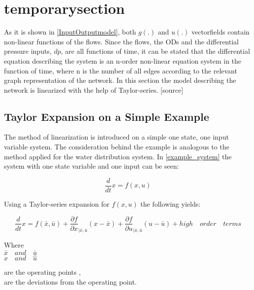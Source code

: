 \section{temporarysection} 
\label{temporarysection}

As it is shown in \eqref{InputOutputmodel}, both $g(.)$ and $u(.)$ vectorfields contain non-linear functions of the flows. Since the flows, the ODs and the differential pressure inputs, $dp$, are all functions of time, it can be stated that the differential equation describing the system is an n-order non-linear equation system in the function of time, where n is the number of all edges according to the relevant graph representation of the network. In this section the model describing the network is linearized with the help of Taylor-series. [source] 

\subsection{Taylor Expansion on a Simple Example}
 \label{Taylorexamplesection}

The method of linearization is introduced on a simple one state, one input variable system. The consideration behind the example is analogous to the method applied for the water distribution system. In \eqref{example_system} the system with one state variable and one input can be seen: 

\begin{equation}
\frac{d}{dt} x = f(x,u)
 \label{example_system}
\end{equation}

Using a Taylor-series expansion for $f(x,u)$ the following yields: 

\begin{equation}
\frac{d}{dt} x = f(\bar{x},\bar{u}) + \frac{\partial f}{\partial x}_{|\bar{x}, \bar{u}} (x-\bar{x}) + \frac{\partial f}{\partial u}_{|\bar{x}, \bar{u}} (u-\bar{u}) + high \quad order \quad terms  
 \label{TaylorExpansion}
\end{equation}

\begin{minipage}[t]{0.20\textwidth}
Where\\
\hspace*{8mm} $\bar{x} \quad and \quad \bar{u}$ \\
\hspace*{8mm} $\hat{x} \quad and \quad \hat{u}$ 
\end{minipage}
\begin{minipage}[t]{0.68\textwidth}
\vspace*{2mm}
are the operating points ,\\
are the deviations from the operating point.
\end{minipage}

